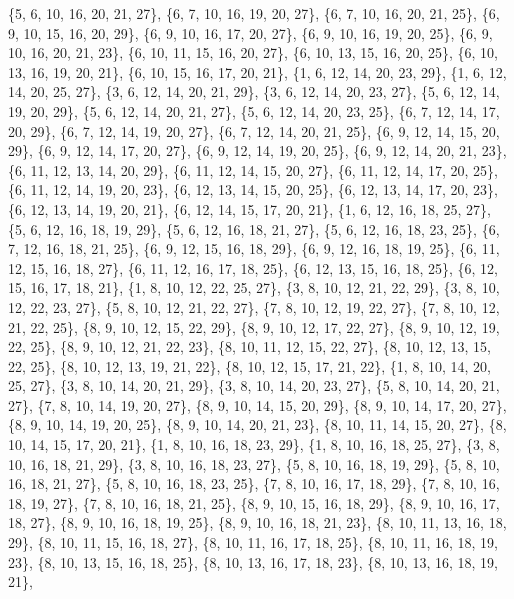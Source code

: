 \documentclass[11pt,a4paper]{article}
\begin{document}
{\{5, 6, 10, 16, 20, 21, 27\}, \{6, 7, 10, 16, 19, 20, 27\}, \{6, 7, 10, 16, 20, 21, 25\}, \{6, 9, 10, 15, 16, 20, 29\}, \{6, 9, 10, 16, 17, 20, 27\},
\{6, 9, 10, 16, 19, 20, 25\}, \{6, 9, 10, 16, 20, 21, 23\}, \{6, 10, 11, 15, 16, 20, 27\}, \{6, 10, 13, 15, 16, 20, 25\}, \{6, 10, 13, 16, 19, 20, 21\},
\{6, 10, 15, 16, 17, 20, 21\}, \{1, 6, 12, 14, 20, 23, 29\}, \{1, 6, 12, 14, 20, 25, 27\}, \{3, 6, 12, 14, 20, 21, 29\}, \{3, 6, 12, 14, 20, 23, 27\},
\{5, 6, 12, 14, 19, 20, 29\}, \{5, 6, 12, 14, 20, 21, 27\}, \{5, 6, 12, 14, 20, 23, 25\}, \{6, 7, 12, 14, 17, 20, 29\}, \{6, 7, 12, 14, 19, 20, 27\},
\{6, 7, 12, 14, 20, 21, 25\}, \{6, 9, 12, 14, 15, 20, 29\}, \{6, 9, 12, 14, 17, 20, 27\}, \{6, 9, 12, 14, 19, 20, 25\}, \{6, 9, 12, 14, 20, 21, 23\},
\{6, 11, 12, 13, 14, 20, 29\}, \{6, 11, 12, 14, 15, 20, 27\}, \{6, 11, 12, 14, 17, 20, 25\}, \{6, 11, 12, 14, 19, 20, 23\}, \{6, 12, 13, 14, 15, 20, 25\},
\{6, 12, 13, 14, 17, 20, 23\}, \{6, 12, 13, 14, 19, 20, 21\}, \{6, 12, 14, 15, 17, 20, 21\}, \{1, 6, 12, 16, 18, 25, 27\}, \{5, 6, 12, 16, 18, 19, 29\},
\{5, 6, 12, 16, 18, 21, 27\}, \{5, 6, 12, 16, 18, 23, 25\}, \{6, 7, 12, 16, 18, 21, 25\}, \{6, 9, 12, 15, 16, 18, 29\}, \{6, 9, 12, 16, 18, 19, 25\},
\{6, 11, 12, 15, 16, 18, 27\}, \{6, 11, 12, 16, 17, 18, 25\}, \{6, 12, 13, 15, 16, 18, 25\}, \{6, 12, 15, 16, 17, 18, 21\}, \{1, 8, 10, 12, 22, 25, 27\},
\{3, 8, 10, 12, 21, 22, 29\}, \{3, 8, 10, 12, 22, 23, 27\}, \{5, 8, 10, 12, 21, 22, 27\}, \{7, 8, 10, 12, 19, 22, 27\}, \{7, 8, 10, 12, 21, 22, 25\},
\{8, 9, 10, 12, 15, 22, 29\}, \{8, 9, 10, 12, 17, 22, 27\}, \{8, 9, 10, 12, 19, 22, 25\}, \{8, 9, 10, 12, 21, 22, 23\}, \{8, 10, 11, 12, 15, 22, 27\},
\{8, 10, 12, 13, 15, 22, 25\}, \{8, 10, 12, 13, 19, 21, 22\}, \{8, 10, 12, 15, 17, 21, 22\}, \{1, 8, 10, 14, 20, 25, 27\}, \{3, 8, 10, 14, 20, 21, 29\},
\{3, 8, 10, 14, 20, 23, 27\}, \{5, 8, 10, 14, 20, 21, 27\}, \{7, 8, 10, 14, 19, 20, 27\}, \{8, 9, 10, 14, 15, 20, 29\}, \{8, 9, 10, 14, 17, 20, 27\},
\{8, 9, 10, 14, 19, 20, 25\}, \{8, 9, 10, 14, 20, 21, 23\}, \{8, 10, 11, 14, 15, 20, 27\}, \{8, 10, 14, 15, 17, 20, 21\}, \{1, 8, 10, 16, 18, 23, 29\},
\{1, 8, 10, 16, 18, 25, 27\}, \{3, 8, 10, 16, 18, 21, 29\}, \{3, 8, 10, 16, 18, 23, 27\}, \{5, 8, 10, 16, 18, 19, 29\}, \{5, 8, 10, 16, 18, 21, 27\},
\{5, 8, 10, 16, 18, 23, 25\}, \{7, 8, 10, 16, 17, 18, 29\}, \{7, 8, 10, 16, 18, 19, 27\}, \{7, 8, 10, 16, 18, 21, 25\}, \{8, 9, 10, 15, 16, 18, 29\},
\{8, 9, 10, 16, 17, 18, 27\}, \{8, 9, 10, 16, 18, 19, 25\}, \{8, 9, 10, 16, 18, 21, 23\}, \{8, 10, 11, 13, 16, 18, 29\}, \{8, 10, 11, 15, 16, 18, 27\},
\{8, 10, 11, 16, 17, 18, 25\}, \{8, 10, 11, 16, 18, 19, 23\}, \{8, 10, 13, 15, 16, 18, 25\}, \{8, 10, 13, 16, 17, 18, 23\}, \{8, 10, 13, 16, 18, 19, 21\},
}
\end{document}
